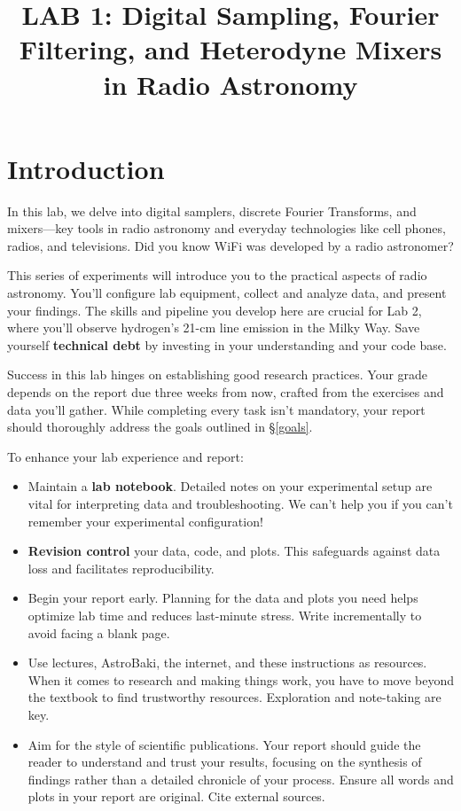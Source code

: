 \documentclass[11pt,preprint]{aastex}
\begin{document}
\def\simlt{\lower.5ex\hbox{$\; \buildrel < \over \sim \;$}}
\def\simgt{\lower.5ex\hbox{$\; \buildrel > \over \sim \;$}}
\def\wLO{\omega_0}

\title{LAB 1: Digital Sampling, Fourier Filtering, and Heterodyne Mixers in Radio Astronomy}

\tableofcontents

\section{Introduction}

\noindent
In this lab, we delve into digital samplers, discrete Fourier Transforms, and
mixers---key tools in radio astronomy and everyday technologies like cell
phones, radios, and televisions. Did you know WiFi was developed by a radio
astronomer?

This series of experiments will introduce you to the practical aspects of radio
astronomy. You'll configure lab equipment, collect and analyze data, and
present your findings. The skills and pipeline you develop here are crucial for
Lab 2, where you'll observe hydrogen's 21-cm line emission in the Milky Way.
Save yourself \textbf{technical debt} by investing in your understanding and your code base.

Success in this lab hinges on establishing good research practices. Your grade depends on the report due three weeks from now, crafted from the exercises and data you'll gather. While completing every task isn't mandatory, your report should thoroughly address the goals outlined in \S\ref{goals}.

To enhance your lab experience and report:

\begin{itemize}
    \item Maintain a \textbf{lab notebook}. Detailed notes on your experimental setup are vital for interpreting data and troubleshooting. We can't help you if you can't remember your experimental configuration!
    \item \textbf{Revision control} your data, code, and plots. This safeguards against data loss and facilitates reproducibility.
    \item Begin your report early. Planning for the data and plots you need helps optimize lab time and reduces last-minute stress. Write incrementally to avoid facing a blank page.
    \item Use lectures, AstroBaki, the internet, and these instructions as resources. When it comes to research and making things work, you have to move beyond the textbook to find trustworthy resources. Exploration and note-taking are key.
    \item Aim for the style of scientific publications. Your report should guide the reader to understand and trust your results, focusing on the synthesis of findings rather than a detailed chronicle of your process. Ensure all words and plots in your report are original. Cite external sources.
\end{itemize}
\end{document}

